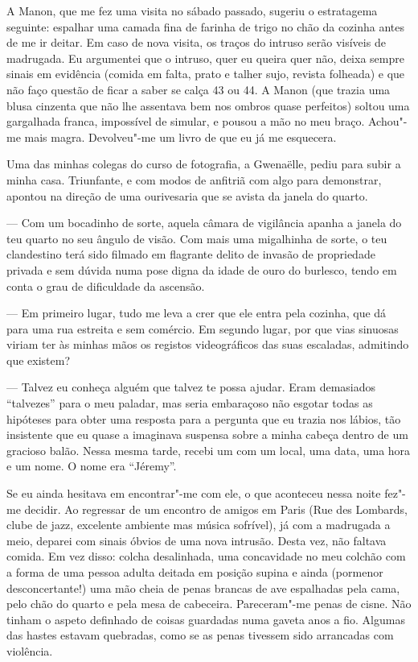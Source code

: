 A Manon, que me fez uma visita no sábado passado, sugeriu o estratagema
seguinte: espalhar uma camada fina de farinha de trigo no chão da
cozinha antes de me ir deitar. Em caso de nova visita, os traços do
intruso serão visíveis de madrugada. Eu argumentei que o intruso, quer
eu queira quer não, deixa sempre sinais em evidência (comida em falta,
prato e talher sujo, revista folheada) e que não faço questão de ficar a
saber se calça 43 ou 44. A Manon (que trazia uma blusa cinzenta que não
lhe assentava bem nos ombros quase
perfeitos) soltou uma gargalhada franca, impossível de simular, e
pousou a mão no meu braço. Achou"-me mais magra. Devolveu"-me um livro de
que eu já me esquecera.

Uma das minhas colegas do curso de fotografia, a Gwenaëlle, pediu para
subir a minha casa. Triunfante, e com modos de anfitriã com algo para
demonstrar, apontou na direção de uma ourivesaria que se avista da
janela do quarto.

--- Com um bocadinho de sorte, aquela câmara de vigilância apanha a
  janela do teu quarto no seu ângulo de visão. Com mais uma migalhinha
  de sorte, o teu clandestino terá sido filmado em flagrante delito de
  invasão de propriedade privada e sem dúvida numa pose digna da idade
  de ouro do burlesco, tendo em conta o grau de dificuldade da ascensão.

--- Em primeiro lugar, tudo me leva a crer que ele entra pela cozinha, que
  dá para uma rua estreita e sem comércio. Em segundo lugar, por que
  vias sinuosas viriam ter às minhas mãos os registos videográficos das
  suas escaladas, admitindo que existem?

--- Talvez eu conheça alguém que talvez te possa ajudar. Eram demasiados
``talvezes'' para o meu paladar, mas seria embaraçoso não esgotar
todas as hipóteses para obter uma resposta
para a pergunta que eu trazia nos lábios, tão insistente que eu quase
a imaginava suspensa sobre a minha cabeça dentro de um gracioso balão.
Nessa mesma tarde, recebi um  com um local, uma data, uma hora e um
nome. O nome era ``Jéremy''.

Se eu ainda hesitava em encontrar"-me com ele, o que aconteceu nessa
noite fez"-me decidir. Ao regressar de um encontro de amigos em Paris
(Rue des Lombards, clube de jazz, excelente ambiente mas música
sofrível), já com a madrugada a meio, deparei com sinais óbvios de uma
nova
intrusão. Desta vez, não faltava comida. Em vez disso: colcha
desalinhada, uma concavidade no meu colchão com a forma de uma pessoa
adulta deitada em posição supina e ainda (pormenor desconcertante!)
uma mão cheia de penas brancas de ave espalhadas pela cama, pelo chão do
quarto e pela mesa de cabeceira. Pareceram"-me penas de cisne. Não tinham
o aspeto definhado de coisas guardadas numa gaveta anos a fio. Algumas
das hastes estavam quebradas, como se as penas tivessem sido arrancadas
com violência.

